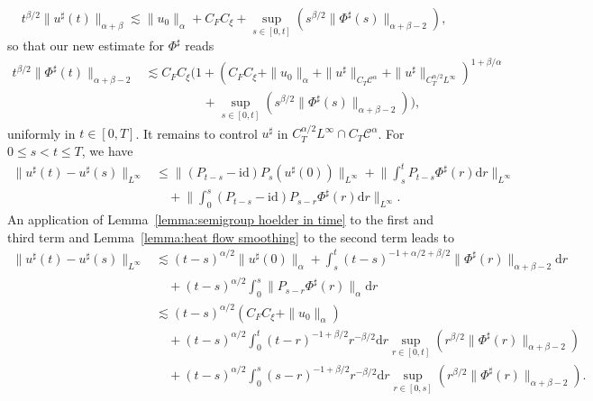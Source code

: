 \documentclass[a4paper,11pt]{article}
\newcommand{\mathd}{\mathrm{d}}
\theoremstyle{remark}
\newcommand{\CC}{\ensuremath{\mathscr{C}}}
\begin{document}
\[
   t^{\beta /2} \| u^{\sharp} ( t ) \|_{\alpha+\beta} \lesssim \| u_{0} \|_{\alpha} + C_{F} C_{\xi} + \sup_{s \in [ 0,t ]} (s^{\beta /2} \| \Phi^{\sharp} ( s ) \|_{\alpha + \beta - 2} ),
\]
so that our new estimate for $\Phi^{\sharp}$ reads
\begin{align*}
   t^{\beta /2} \| \Phi^{\sharp} ( t ) \|_{\alpha+\beta -2} & \lesssim C_F C_\xi \Big( 1 + (C_F C_\xi + \|u_0\|_\alpha + \| u^\sharp \|_{C_{T} \CC^\alpha} + \|u^\sharp \|_{C^{\alpha/2}_TL^\infty})^{1+\beta/\alpha} \\
   &\hspace{55pt} + \sup_{s \in [ 0,t ]} (s^{\beta /2} \| \Phi^{\sharp} ( s ) \|_{\alpha + \beta - 2}) \Big),
\end{align*}
uniformly in $t \in [ 0,T ]$. It remains to control $u^\sharp$ in $C^{\alpha/2}_TL^\infty \cap C_T \CC^\alpha$. For $0\leqslant s < t \leqslant T$, we have
\begin{align*}
   \| u^\sharp(t) - u^\sharp(s)\|_{L^\infty} & \leqslant \|(P_{t-s} - \mathrm{id}) P_s (u^\sharp(0))\|_{L^\infty} + \bigg\| \int_s^t P_{t-s} \Phi^\sharp(r) \mathd r \bigg\|_{L^\infty} \\
   &\quad + \bigg\| \int_0^s (P_{t-s} - \mathrm{id}) P_{s-r} \Phi^\sharp(r) \mathd r \bigg\|_{L^\infty}.
\end{align*}
An application of Lemma~\ref{lemma:semigroup hoelder in time} to the first and third term and Lemma~\ref{lemma:heat flow smoothing} to the second term leads to
\begin{align*}
   \| u^\sharp(t) - u^\sharp(s)\|_{L^\infty} & \lesssim (t-s)^{\alpha/2} \|u^\sharp(0)\|_{\alpha} + \int_s^t (t-s)^{-1+\alpha/2+\beta/2} \|\Phi^\sharp(r)\|_{\alpha+\beta-2} \mathd r \\
   &\quad + (t-s)^{\alpha/2} \int_0^s \| P_{s-r} \Phi^\sharp(r) \|_{\alpha} \mathd r \\
   &\lesssim (t-s)^{\alpha/2} (C_F C_\xi + \|u_0\|_\alpha) \\
   &\quad + (t-s)^{\alpha/2} \int_0^t (t-r)^{-1+\beta/2} r^{-\beta/2} \mathd r \sup_{r \in [ 0,t ]} ( r^{\beta /2} \| \Phi^{\sharp} ( r ) \|_{\alpha + \beta -2} ) \\
   &\quad + (t-s)^{\alpha/2} \int_0^s (s-r)^{-1+\beta/2} r^{-\beta/2}\mathd r \sup_{r \in [ 0,s ]} ( r^{\beta /2} \| \Phi^{\sharp} ( r ) \|_{\alpha + \beta -2} ).
\end{align*}
\end{document}
